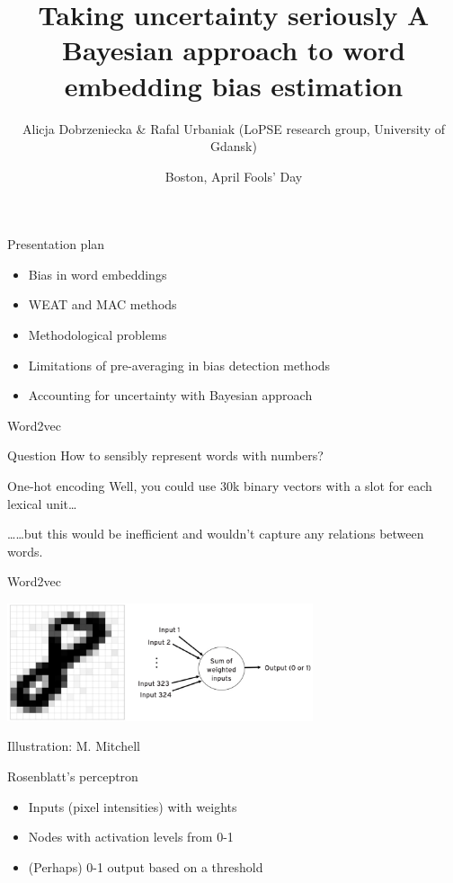 \documentclass[
  10pt,
  ignorenonframetext,
  x11names, dvipsnames, bibspacing,natbib, table]{beamer}
\title{\Large Taking uncertainty seriously \newline \normalsize A
Bayesian approach to word embedding bias estimation}
\author{Alicja Dobrzeniecka \& Rafal Urbaniak
\footnotesize \newline (LoPSE research group, University of Gdansk)}
\date{Boston, April Fools' Day}
\providecommand{\tightlist}{%
  \setlength{\itemsep}{0pt}\setlength{\parskip}{0pt}}
\begin{document}
\frame{\titlepage}

\begin{frame}{Presentation plan}
\protect\hypertarget{presentation-plan}{}
\begin{itemize}
\tightlist
\item
  Bias in word embeddings
\item
  WEAT and MAC methods
\item
  Methodological problems
\item
  Limitations of pre-averaging in bias detection methods
\item
  Accounting for uncertainty with Bayesian approach
\end{itemize}
\end{frame}

\begin{frame}{Word2vec}
\protect\hypertarget{word2vec}{}
\begin{block}{Question}
\protect\hypertarget{question}{}
How to sensibly represent words with numbers?

\pause
\end{block}

\begin{block}{One-hot encoding}
\protect\hypertarget{one-hot-encoding}{}
Well, you could use 30k binary vectors with a slot for each lexical
unit\dots

\pause

\dots \dots but this would be inefficient and wouldn't capture any
relations between words.
\end{block}
\end{frame}

\begin{frame}{Word2vec}
\protect\hypertarget{word2vec-1}{}
\begin{center}
 \includegraphics[width = 9cm]{images/perceptron1.png}
\end{center}

\vspace{-3mm}

\tiny \hfill \color{gray}Illustration: M. Mitchell \color{black}

\footnotesize

\begin{block}{Rosenblatt's perceptron}
\begin{itemize}
\item Inputs (pixel intensities) with weights
\item Nodes with activation levels from 0-1
\item (Perhaps) 0-1 output based on a threshold
\end{itemize}
\end{block}
\end{frame}
\end{document}
